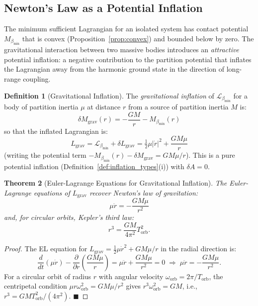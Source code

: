 \documentclass[12pt, a4paper]{article}
\theoremstyle{plain}
\newtheorem{theorem}{Theorem}[section]
\theoremstyle{definition}
\newtheorem{definition}[theorem]{Definition}
\theoremstyle{remark}
\newcommand{\bmin}{\beta_{\min}}
\newcommand{\Lmin}{\mathcal{L}_{\bmin}}
\newcommand{\half}{\tfrac{1}{2}}
\newcommand{\qed}{\hfill$\blacksquare$}
\begin{document}
\subsection{Newton's Law as a Potential Inflation}

The minimum sufficient Lagrangian for an isolated system has contact potential
$M_{\bmin}$ that is convex (Proposition~\ref{prop:convex}) and bounded below
by zero. The gravitational interaction between two massive bodies introduces an
\emph{attractive} potential inflation: a negative contribution to the partition
potential that inflates the Lagrangian away from the harmonic ground state in
the direction of long-range coupling.

\begin{definition}[Gravitational Inflation]
\label{def:grav_inflation}
The \emph{gravitational inflation} of $\Lmin$ for a body of partition inertia
$\mu$ at distance $r$ from a source of partition inertia $M$ is:
\[
  \delta M_{\mathrm{grav}}(r) = -\frac{GM}{r} - M_{\bmin}(r)
\]
so that the inflated Lagrangian is:
\[
  L_{\mathrm{grav}} = \Lmin + \delta L_{\mathrm{grav}}
  = \half\mu|\dot{r}|^2 + \frac{GM\mu}{r}
\]
(writing the potential term $-M_{\bmin}(r) - \delta M_{\mathrm{grav}} = GM\mu/r$).
This is a pure potential inflation (Definition~\ref{def:inflation_types}(i))
with $\delta A = 0$.
\end{definition}

\begin{theorem}[Euler-Lagrange Equations for Gravitational Inflation]
\label{thm:newtongrav}
The Euler-Lagrange equations of $L_{\mathrm{grav}}$ recover Newton's law of
gravitation:
\[
  \mu\ddot{r} = -\frac{GM\mu}{r^2}
\]
and, for circular orbits, Kepler's third law:
\[
  r^3 = \frac{GM}{4\pi^2}T_{\mathrm{orb}}^2.
\]
\end{theorem}

\begin{proof}
The EL equation for $L_{\mathrm{grav}} = \half\mu\dot{r}^2 + GM\mu/r$ in the
radial direction is:
\[
  \frac{d}{dt}(\mu\dot{r}) - \frac{\partial}{\partial r}\!\left(\frac{GM\mu}{r}\right)
  = \mu\ddot{r} + \frac{GM\mu}{r^2} = 0
  \;\Longrightarrow\; \mu\ddot{r} = -\frac{GM\mu}{r^2}.
\]
For a circular orbit of radius $r$ with angular velocity $\omega_{\mathrm{orb}} =
2\pi/T_{\mathrm{orb}}$, the centripetal condition $\mu r\omega_{\mathrm{orb}}^2 =
GM\mu/r^2$ gives $r^3\omega_{\mathrm{orb}}^2 = GM$, i.e.,
$r^3 = GM T_{\mathrm{orb}}^2/(4\pi^2)$. \qed
\end{proof}
\end{document}
